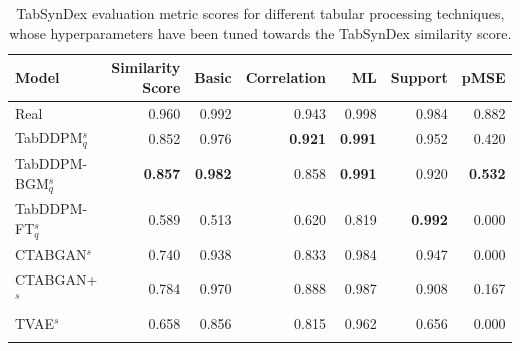 \begin{table}[h]
	\centering
	\begin{tabular}{lrrrrrr}
		\toprule
		\textbf{Model}        & \textbf{Similarity Score} & \textbf{Basic} & \textbf{Correlation} & \textbf{ML}    & \textbf{Support} & \textbf{pMSE}  \\
		\midrule
		Real                  & 0.960                     & 0.992          & 0.943                & 0.998          & 0.984            & 0.882          \\
		TabDDPM$^{s}_{q}$     & 0.852                     & 0.976          & \textbf{0.921}       & \textbf{0.991} & 0.952            & 0.420          \\
		TabDDPM-BGM$^{s}_{q}$ & \textbf{0.857}            & \textbf{0.982} & 0.858                & \textbf{0.991} & 0.920            & \textbf{0.532} \\
		TabDDPM-FT$^{s}_{q}$  & 0.589                     & 0.513          & 0.620                & 0.819          & \textbf{0.992}   & 0.000          \\
		CTABGAN$^{s}$         & 0.740                     & 0.938          & 0.833                & 0.984          & 0.947            & 0.000          \\
		CTABGAN+$^{s}$        & 0.784                     & 0.970          & 0.888                & 0.987          & 0.908            & 0.167          \\
		TVAE$^{s}$            & 0.658                     & 0.856          & 0.815                & 0.962          & 0.656            & 0.000          \\
		\bottomrule
		\multicolumn{7}{c}{}\\[-0.6em]
	\end{tabular}
	\caption[Experiment 2 TabSynDex]{TabSynDex evaluation metric scores for different tabular processing techniques, whose hyperparameters have been tuned towards the TabSynDex similarity score.}
	\label{tab:exp2-sim}
\end{table}

